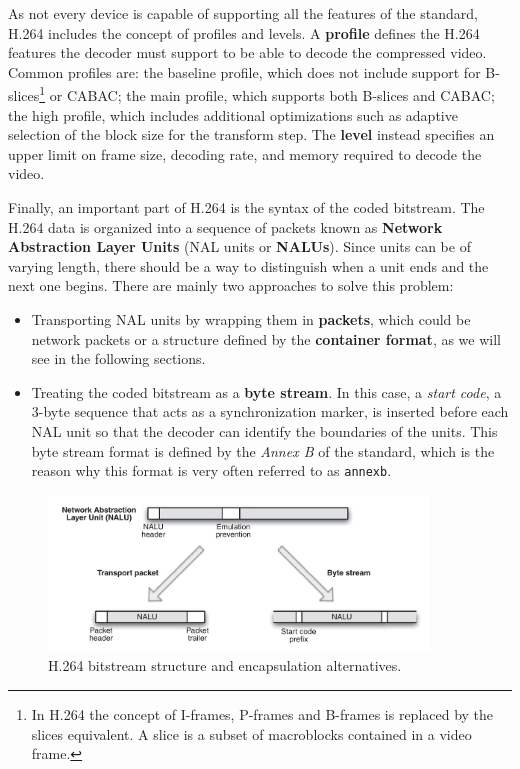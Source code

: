 As not every device is capable of supporting all the features of the standard, H.264 includes the concept of profiles and levels. A \textbf{profile} defines the H.264 features the decoder must support to be able to decode the compressed video. Common profiles are: the baseline profile, which does not include support for B-slices\footnote{In H.264 the concept of I-frames, P-frames and B-frames is replaced by the slices equivalent. A slice is a subset of macroblocks contained in a video frame.} or CABAC; the main profile, which supports both B-slices and CABAC; the high profile, which includes additional optimizations such as adaptive selection of the block size for the transform step. The \textbf{level} instead specifies an upper limit on frame size, decoding rate, and memory required to decode the video.

Finally, an important part of H.264 is the syntax of the coded bitstream. The H.264 data is organized into a sequence of packets known as \textbf{Network Abstraction Layer Units} (NAL units or \textbf{NALUs}). Since units can be of varying length, there should be a way to distinguish when a unit ends and the next one begins. There are mainly two approaches to solve this problem:

\begin{itemize}
    \item Transporting NAL units by wrapping them in \textbf{packets}, which could be network packets or a structure defined by the \textbf{container format}, as we will see in the following sections.
    \item Treating the coded bitstream as a \textbf{byte stream}. In this case, a \textit{start code}, a 3-byte sequence that acts as a synchronization marker, is inserted before each NAL unit so that the decoder can identify the boundaries of the units. This byte stream format is defined by the \textit{Annex B} of the standard, which is the reason why this format is very often referred to as \texttt{annexb}.
\end{itemize}

\begin{figure}
	\centering
	
	\includegraphics[width=0.9\textwidth]{res/h264_nalu.png}
	
	\caption{H.264 bitstream structure and encapsulation alternatives.\cite{h264}}
	\label{fig:h264_encapsulation}
\end{figure}

